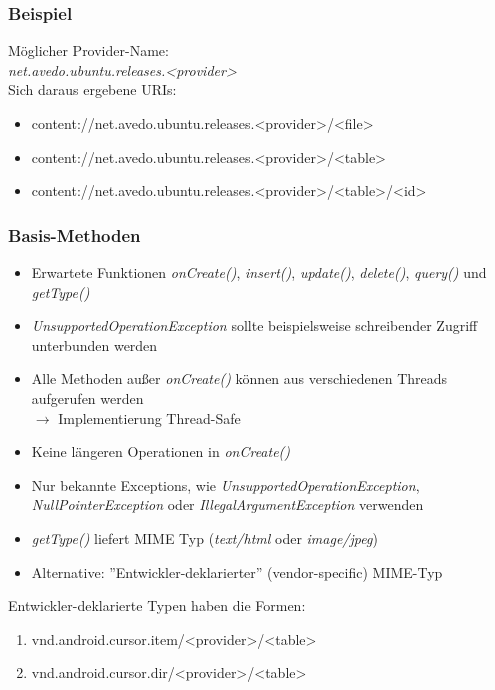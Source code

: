 \begin{frame}
   \frametitle{Beispiel}
   
   Möglicher Provider-Name:\\
   \emph{net.avedo.ubuntu.releases.\textless{}provider\textgreater}\\
   
   Sich daraus ergebene URIs:
   \begin{itemize}
		\item content://net.avedo.ubuntu.releases.\textless{}provider\textgreater/\textless{}file\textgreater
		\item content://net.avedo.ubuntu.releases.\textless{}provider\textgreater/\textless{}table\textgreater
		\item content://net.avedo.ubuntu.releases.\textless{}provider\textgreater/\textless{}table\textgreater/\textless{}id\textgreater
	\end{itemize}
\end{frame}

\begin{frame}
   \frametitle{Basis-Methoden}
   \begin{itemize}
   	\item Erwartete Funktionen \emph{onCreate()}, \emph{insert()}, \emph{update()}, 
   		\emph{delete()}, \emph{query()} und \emph{getType()}
   	\item \emph{UnsupportedOperationException} sollte beispielsweise
   		schreibender Zugriff unterbunden werden
   	\item Alle Methoden außer \emph{onCreate()} können aus verschiedenen Threads 
   		aufgerufen werden\\
   		$\rightarrow$ Implementierung Thread-Safe
   	\item Keine längeren Operationen in \emph{onCreate()}
   	\item Nur bekannte Exceptions, wie \emph{UnsupportedOperationException}, 
   	\emph{NullPointerException} oder \emph{IllegalArgumentException} verwenden
   	\item \emph{getType()} liefert MIME Typ (\emph{text/html} oder \emph{image/jpeg})
   	\item Alternative: ''Entwickler-deklarierter'' (vendor-specific) MIME-Typ
	\end{itemize}
	
	Entwickler-deklarierte Typen haben die Formen:
	
   \begin{enumerate}
   	\item vnd.android.cursor.item/\textless{}provider\textgreater/\textless{}table\textgreater
   	\item vnd.android.cursor.dir/\textless{}provider\textgreater/\textless{}table\textgreater
   \end{enumerate}
\end{frame}

